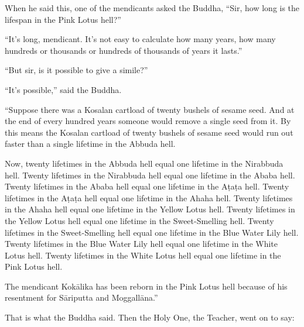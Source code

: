 \documentclass[12pt,openany]{book}%
\begin{document}
When he said this, one of the mendicants asked the Buddha, “Sir, how long is the lifespan in the Pink Lotus hell?” 

“It’s long, mendicant. It’s not easy to calculate how many years, how many hundreds or thousands or hundreds of thousands of years it lasts.” 

“But sir, is it possible to give a simile?” 

“It’s possible,” said the Buddha. 

“Suppose there was a Kosalan cartload of twenty bushels of sesame seed. And at the end of every hundred years someone would remove a single seed from it. By this means the Kosalan cartload of twenty bushels of sesame seed would run out faster than a single lifetime in the Abbuda hell. 

Now, twenty lifetimes in the Abbuda hell equal one lifetime in the Nirabbuda hell. Twenty lifetimes in the Nirabbuda hell equal one lifetime in the Ababa hell. Twenty lifetimes in the Ababa hell equal one lifetime in the \textsanskrit{Aṭaṭa} hell. Twenty lifetimes in the \textsanskrit{Aṭaṭa} hell equal one lifetime in the Ahaha hell. Twenty lifetimes in the Ahaha hell equal one lifetime in the Yellow Lotus hell. Twenty lifetimes in the Yellow Lotus hell equal one lifetime in the Sweet-Smelling hell. Twenty lifetimes in the Sweet-Smelling hell equal one lifetime in the Blue Water Lily hell. Twenty lifetimes in the Blue Water Lily hell equal one lifetime in the White Lotus hell. Twenty lifetimes in the White Lotus hell equal one lifetime in the Pink Lotus hell. 

The mendicant \textsanskrit{Kokālika} has been reborn in the Pink Lotus hell because of his resentment for \textsanskrit{Sāriputta} and \textsanskrit{Moggallāna}.” 

That is what the Buddha said. Then the Holy One, the Teacher, went on to say: 
\end{document}
